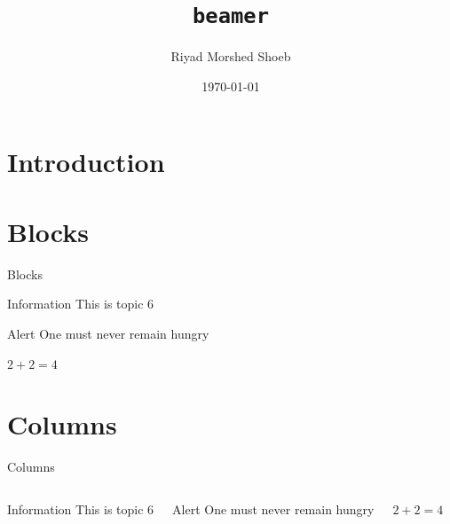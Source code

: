 \documentclass[aspectratio=169]{beamer}
\title[Short title]{\texttt{beamer}}
\author[RM Shoeb]{Riyad Morshed Shoeb}
\institute[RUET]{Rajshahi University of Engineering and Technology}
\date{\today}
\begin{document}

\begin{frame}
    \maketitle
\end{frame}

\section{Introduction}\label{sec:intro}
\begin{frame}[c]{}
    \lipsum[1-1]
\end{frame}
\begin{frame}[allowframebreaks]{}
    \lipsum[1-2]
\end{frame}

\section{Blocks}
\begin{frame}{Blocks}
\begin{block}{Information}
	This is topic 6
\end{block}
\pause
\begin{alertblock}{Alert}
	One must never remain hungry
\end{alertblock}
\begin{example}
	$2 + 2 = 4$
\end{example}
\end{frame}

\section{Columns}
\begin{frame}{Columns}
	\begin{columns}
		\begin{block}{Information}
			This is topic 6
		\end{block}
		\begin{alertblock}{Alert}
			One must never remain hungry
		\end{alertblock}
		\begin{example}
			$2 + 2 = 4$
		\end{example}	
	\end{columns}
\end{frame}
\end{document}
